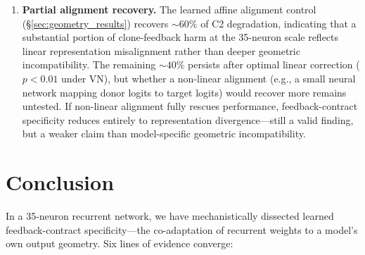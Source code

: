 \documentclass[10pt]{article}
\begin{document}
\begin{enumerate}
\item \textbf{Partial alignment recovery.} The learned affine alignment control (\S\ref{sec:geometry_results}) recovers ${\sim}60\%$ of C2 degradation, indicating that a substantial portion of clone-feedback harm at the 35-neuron scale reflects linear representation misalignment rather than deeper geometric incompatibility. The remaining ${\sim}40\%$ persists after optimal linear correction ($p < 0.01$ under VN), but whether a non-linear alignment (e.g., a small neural network mapping donor logits to target logits) would recover more remains untested. If non-linear alignment fully rescues performance, feedback-contract specificity reduces entirely to representation divergence---still a valid finding, but a weaker claim than model-specific geometric incompatibility.

\end{enumerate}

\section{Conclusion}

In a 35-neuron recurrent network, we have mechanistically dissected learned feedback-contract specificity---the co-adaptation of recurrent weights to a model's own output geometry. Six lines of evidence converge:
\end{document}
